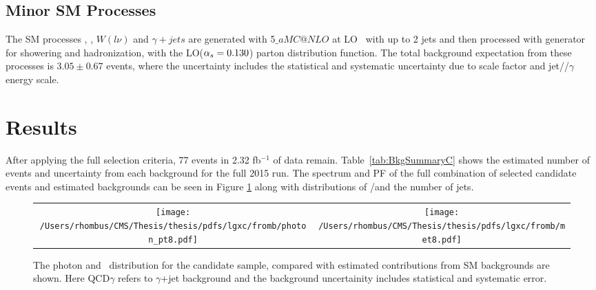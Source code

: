  \subsection{Minor SM Processes}
The SM processes \wlng, \zllg, $W(l\nu)$ and $\gamma+jets$
 are generated with \MADGRAPH{}5$\_aMC@NLO$ at LO~\cite{Madgraph_new}
 with up to 2 jets and then
 processed with  generator~\cite{Pythia6} for showering and hadronization,
 with the \NNPDFthree LO($\alpha_s = 0.130$) parton distribution function.
The total background expectation from these processes is $3.05\pm 0.67$ events,
 where the uncertainty includes the statistical and systematic uncertainty due
 to scale factor and jet/\met/$\gamma$ energy scale.


 
\section{Results}

After applying the full selection criteria,
 77 events in 2.32 fb$^{-1}$ of data remain.
Table~\ref{tab:BkgSummaryC}
shows the estimated number of events and uncertainty from each background for the full 2015 run.
The \pt spectrum and PF \met of the full
 combination of selected candidate events and
 estimated backgrounds can be seen in Figure \ref{fig:ptmetstack}
 along with distributions of \pt/\met and 
 the number of jets.

\begin{figure}[htb]
\caption[Signal region distributions in the \pploneg analysis]
 {The photon \pt and \met\ distribution for the candidate sample,
  compared with estimated contributions from SM backgrounds are shown.
  Here QCD$\gamma$ refers to $\gamma$+jet background and the
  background uncertainity includes statistical and systematic error. }
\begin{centering}
\begin{tabular}{cc}
\texttt{[image: /Users/rhombus/CMS/Thesis/thesis/pdfs/lgxc/fromb/photon\_pt8.pdf]} &
\texttt{[image: /Users/rhombus/CMS/Thesis/thesis/pdfs/lgxc/fromb/met8.pdf]}
\end{tabular}
\end{centering}
\label{fig:ptmetstack}
\end{figure}


